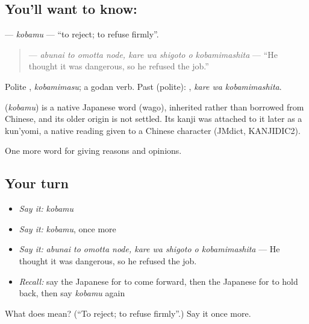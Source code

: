 \subsection*{You'll want to know: }
\textbf{} — \emph{kobamu} — \textquotedblleft{}to reject; to refuse firmly\textquotedblright{}.

\begin{quote}
\textbf{   } — \emph{abunai to omotta node, kare wa shigoto o kobamimashita} — \textquotedblleft{}He thought it was dangerous, so he refused the job.\textquotedblright{}
\end{quote}

Polite \textbf{}, \emph{kobamimasu}; a godan verb. Past (polite): \textbf{ }, \emph{kare wa kobamimashita}.

\begin{cousinweb}
\textbf{} (\emph{kobamu}) is a native Japanese word (wago), inherited rather than borrowed from Chinese, and its older origin is not settled. Its kanji was attached to it later as a kun'yomi, a native reading given to a Chinese character (JMdict, KANJIDIC2).
\end{cousinweb}

\begin{grammarlens}[title={What you've built}]
One more word for giving reasons and opinions.
\end{grammarlens}

\subsection*{Your turn}
\begin{itemize}
\raggedright
  \item \emph{Say it:} \emph{kobamu}
  \item \emph{Say it:} \emph{kobamu}, once more
  \item \emph{Say it:} \emph{abunai to omotta node, kare wa shigoto o kobamimashita} — He thought it was dangerous, so he refused the job.
  \item \emph{Recall:} say the Japanese for to come forward, then the Japanese for to hold back, then say \emph{kobamu} again
\end{itemize}

\begin{tcolorbox}[breakable,colback=teal!4,colframe=teal!35!black,title={Before you move on}]
What does  mean? (\textquotedblleft{}To reject; to refuse firmly\textquotedblright{}.) Say it once more.
\end{tcolorbox}
